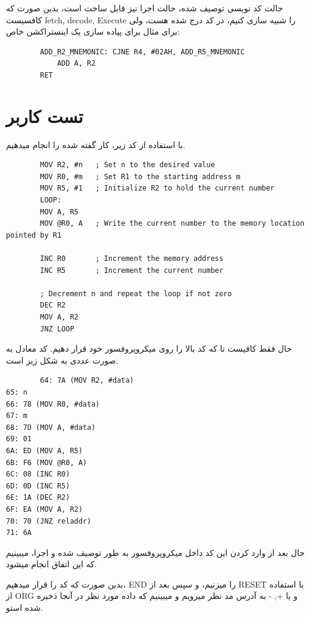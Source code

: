 \documentclass[11pt]{article}
\begin{document}
حالت کد نویسی توصیف شده، حالت اجرا نیز قابل ساخت است، بدین صورت که کافسیست fetch, decode, Execute را
شبیه سازی کنیم، در کد درج شده هست، ولی برای مثال برای پیاده سازی یک اینستراکشن خاص:

\begin{latin}
	\begin{verbatim}
		ADD_R2_MNEMONIC: CJNE R4, #02AH, ADD_R5_MNEMONIC
        	ADD A, R2
    	RET
	\end{verbatim}
\end{latin}

\clearpage

\section{تست کاربر}

با استفاده از کد زیر، کار گفته شده را انجام میدهیم.
\begin{latin}
	\begin{verbatim}
		MOV R2, #n   ; Set n to the desired value
		MOV R0, #m   ; Set R1 to the starting address m
		MOV R5, #1   ; Initialize R2 to hold the current number
		LOOP:
		MOV A, R5
		MOV @R0, A   ; Write the current number to the memory location pointed by R1
		
		INC R0       ; Increment the memory address
		INC R5       ; Increment the current number
		
		; Decrement n and repeat the loop if not zero
		DEC R2
		MOV A, R2    
		JNZ LOOP
	\end{verbatim}
\end{latin}

حال فقط کافیست تا که کد بالا را روی میکروپروفسور خود قرار دهیم. کد معادل به صورت عددی به شکل زیر است.

\begin{latin}
	\begin{verbatim}
		64: 7A (MOV R2, #data)
65: n
66: 78 (MOV R0, #data)
67: m
68: 7D (MOV A, #data)
69: 01
6A: ED (MOV A, R5)
6B: F6 (MOV @R0, A)
6C: 08 (INC R0)
6D: 0D (INC R5)
6E: 1A (DEC R2)
6F: EA (MOV A, R2)
70: 70 (JNZ reladdr)
71: 6A
	\end{verbatim}
\end{latin}

حال بعد از وارد کردن این کد داخل میکروپروفسور به طور توصیف شده و اجرا، میبینیم که
این اتفاق انجام میشود.

بدین صورت که کد را قرار میدهیم، END را میزنیم، و سپس بعد از RESET با استفاده از
ORG و یا +, - به آدرس مد نظر میرویم و میبینیم که داده مورد نظر در آنجا ذخیره شده استو.
\vfil
\end{document}
